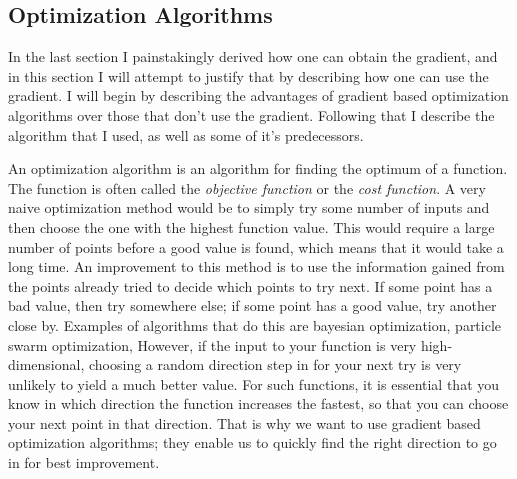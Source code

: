 
\subsection{Optimization Algorithms}

In the last section I painstakingly derived how one can obtain the gradient,
and in this section I will attempt to justify that by describing how one can use
the gradient.
I will begin by describing the advantages of gradient based optimization
algorithms over those that don't use the gradient.
Following that I describe the algorithm that I used, as well as some of it's
predecessors.

An optimization algorithm is an algorithm for finding the optimum of a function.
The function is often called the \emph{objective function} or the \emph{cost
function}.
A very naive optimization method would be to simply try some number of inputs
and then choose the one with the highest function value.
This would require a large number of points before a good value is found,
which means that it would take a long time.
An improvement to this method is to use the information gained from the points
already tried to decide which points to try next.
If some point has a bad value, then try somewhere else; if some point has a good
value, try another close by.
Examples of algorithms that do this are bayesian optimization, particle swarm
optimization, 
However, if the input to your function is very high-dimensional,
choosing a random direction step in for your next try is very unlikely
to yield a much better value.
For such functions, it is essential that you know in which direction the
function increases the fastest, so that you can choose your next point in that
direction. That is why we want to use gradient based optimization algorithms;
they enable us to quickly find the right direction to go in for best
improvement.


